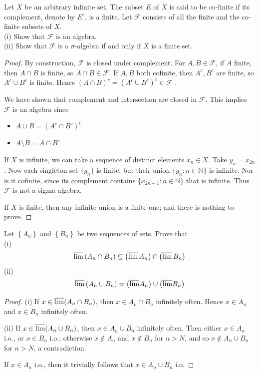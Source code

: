 \begin{problem}
	Let $X$ be an arbitrary infinite set. The subset $E$ of $X$ is said to be co-finite if its complement, denote by $E^c$, is a finite. Let $\mathcal{F}$ consists of all the finite and the co-finite subsets of $X$.\\
(i) Show that $\mathcal{F}$ is an algebra.\\
(ii) Show that $\mathcal{F}$ is a $\sigma$-algebra if and only if $X$ is a finite set.
\end{problem}
\begin{proof}
	By construction, $\mathcal{F}$ is closed under complement. For $A, B \in \mathcal{F}$, if $A$ finite, then $A \cap B$ is finite, so $A \cap B \in \mathcal{F}$. If $A, B$ both cofinite, then $A^c, B^c$ are finite, so $A^c \cup B^c$ is finite. Hence $(A \cap B)^c  = (A^c \cup B^c)^c \in \mathcal{F}$ .

	We have shown that complement and intersection are closed in $\mathcal{F}$. This implies $\mathcal{F}$ is an algebra since
	\begin{itemize}
		\item $A \cup B = (A^c \cap B^c)^c$
		\item $A \setminus B = A \cap B^c$
	\end{itemize}

	If $X$ is infinite, we can take a sequence of distinct elements $x_n \in X$. Take $y_n = x_{2 n}$. Now each singleton set $\{y_n\} $ is finite, but their union $\{y_n: n \in \mathbb{N}\} $ is infinite. Nor is it cofinite, since its complement contains $\{x_{2 n - 1}: n \in \mathbb{N}\} $ that is infinite. Thus $\mathcal{F}$ is not a sigma algebra.

	If $X$ is finite, then any infinite union is a finite one; and there is nothing to prove.
\end{proof}


\begin{problem}
	Let $\left\{A_n\right\}$ and $\left\{B_n\right\}$ be two sequences of sets. Prove that\\
(i)
\[
\varlimsup\left(A_n \cap B_n\right) \subseteq\left(\varlimsup A_n\right) \cap\left(\varlimsup  B_n\right)
\]
(ii)
\[
\varlimsup\left(A_n \cup B_n\right)=\left(\overline{\lim } A_n\right) \cup\left(\overline{\lim } B_n\right)
\]
\end{problem}
\begin{proof}
	(i) If $x \in \varlimsup (A_n \cap B_n)$, then $x \in A_n \cap B_n$ infinitely often. Hence $x \in A_n$ and $x \in B_n$ infinitely often.

	(ii) If $x \in \varlimsup (A_n \cup B_n)$, then $x \in A_n \cup B_n$ infinitely often. Then either $x \in A_n$ i.o., or $x \in B_n $ i.o.; otherwise $x \not\in A_n$ and $x \not\in B_n$ for $n > N$, and so $x \not\in A_n \cup B_n$ for $n > N$, a contradiction.

	If $x \in A_n$ i.o., then it trivially follows that $x \in A_n \cup B_n$ i.o.
\end{proof}


